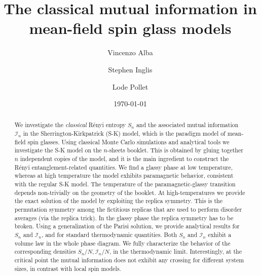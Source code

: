 \documentclass[twocolumn,superscriptaddress,prb,10pt]{revtex4-1}
\begin{document}
\title{The classical mutual information in mean-field spin glass models} 

\author{Vincenzo Alba}
\author{Stephen Inglis}
\author{Lode Pollet}

\date{\today}




\begin{abstract} 

We investigate the \emph{classical} R\'enyi entropy $S_n$ and the associated mutual 
information ${\mathcal I}_n$ in the Sherrington-Kirkpatrick (S-K) model, which is the 
paradigm model of mean-field spin glasses. 
Using classical Monte Carlo simulations and analytical tools we investigate the 
S-K model on the $n$-sheets booklet.
This is obtained by gluing together $n$ independent copies of the model, and it is the 
main ingredient to construct the R\'enyi entanglement-related quantities. We find a 
glassy phase at low temperature, whereas at high temperature the model exhibits 
paramagnetic behavior, consistent with the regular S-K model. The temperature of the 
paramagnetic-glassy transition depends 
non-trivially on the geometry of the booklet. At high-temperatures we provide the exact 
solution of the model by exploiting the replica symmetry. This is the permutation symmetry 
among the fictitious replicas that are used to perform disorder averages (via the replica 
trick). In the glassy phase the replica symmetry has to be broken. Using a generalization 
of the Parisi solution, we provide analytical results for $S_n$ and ${\mathcal I}_n$, 
and for standard thermodynamic quantities. Both $S_n$ and ${\mathcal I}_n$ exhibit a 
volume law in the whole phase diagram. We fully characterize the behavior of the 
corresponding densities $S_n/N,{\mathcal I}_n/N$, in the thermodynamic limit. 
Interestingly, at the critical point the mutual information does not exhibit any 
crossing for different system sizes, in contrast with local spin models. 

\end{abstract}

\end{document}
